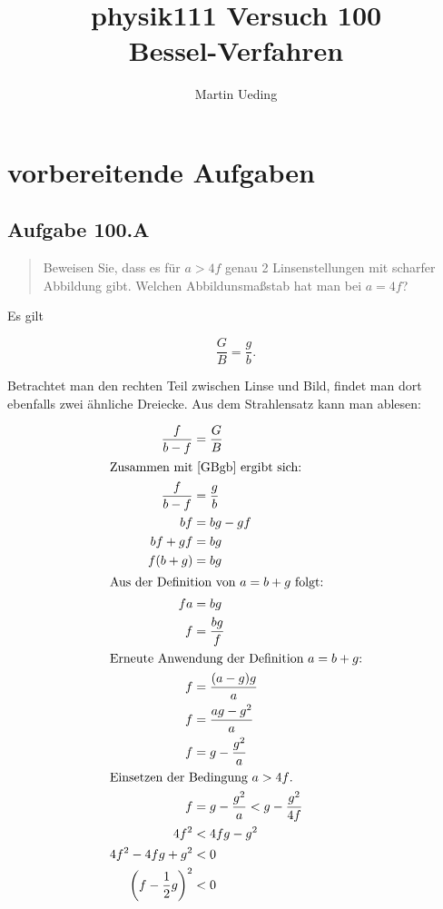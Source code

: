 \documentclass[11pt]{article}
\title{physik111 Versuch 100 \\ Bessel-Verfahren}
\author{Martin Ueding}
\newcommand{\half}{\frac{1}{2}}
\begin{document}
\maketitle

\section{vorbereitende Aufgaben}

\subsection{Aufgabe 100.A}

\begin{quote}
Beweisen Sie, dass es für $a > 4f$ genau 2 Linsenstellungen mit scharfer Abbildung gibt. Welchen Abbildunsmaßstab hat man bei $a = 4f$?
\end{quote}

Es gilt

\begin{equation}
\label{GBgb}
\frac{G}{B} = \frac{g}{b}.
\end{equation}

Betrachtet man den rechten Teil zwischen Linse und Bild, findet man dort ebenfalls zwei ähnliche Dreiecke. Aus dem Strahlensatz kann man ablesen:

\begin{align*}
\frac{f}{b-f} &= \frac{G}{B} \\
%
\intertext{Zusammen mit \eqref{GBgb} ergibt sich:}
%
\frac{f}{b-f} &= \frac{g}{b} \\
bf &= bg-gf \\
bf+gf &= bg \\
f(b+g) &= bg \\
%
\intertext{Aus der Definition von $a = b + g$ folgt:}
%
fa &= bg \\
f &= \frac{bg}{f} \\
%
\intertext{Erneute Anwendung der Definition $a = b + g$:}
%
f &= \frac{(a-g)g}{a} \\
f &= \frac{ag-g^2}{a} \\
f &= g - \frac{g^2}{a} \\
%
\intertext{Einsetzen der Bedingung $a > 4f$.}
%
f &= g - \frac{g^2}{a} < g - \frac{g^2}{4f} \\
4f^2 &< 4fg - g^2 \\
4f^2 - 4fg + g^2 &< 0 \\
\left(f-\half g \right)^2 &< 0 \\
\end{align*}
\end{document}
